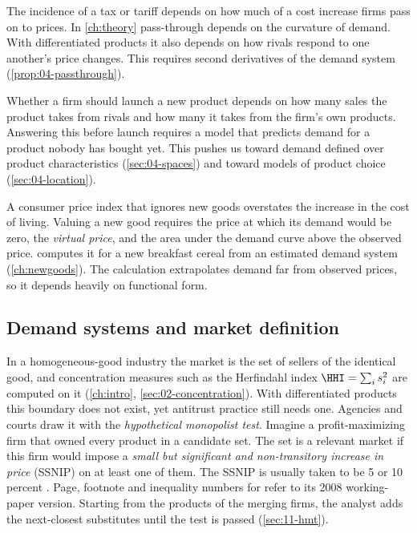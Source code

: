 The incidence of a tax or tariff depends on how much of a cost increase firms pass on to prices. In
\cref{ch:theory} pass-through depends on the curvature of demand. With differentiated products it also depends on
how rivals respond to one another's price changes. This requires second derivatives of the demand system
(\cref{prop:04-passthrough}).

Whether a firm should launch a new product depends on how many sales the product takes from rivals and how many it
takes from the firm's own products. Answering this before launch requires a model that predicts demand for a
product nobody has bought yet. This pushes us toward demand defined over product characteristics
(\cref{sec:04-spaces}) and toward models of product choice (\cref{sec:04-location}).

A consumer price index that ignores new goods overstates the increase in the cost of living. Valuing a new good
requires the price at which its demand would be zero, the \emph{virtual price}, and the area under the demand
curve above the observed price. \citet{Hausman1997} computes it for a new breakfast cereal from an estimated
demand system (\cref{ch:newgoods}). The calculation extrapolates demand far from observed prices, so it depends
heavily on functional form.

\subsection{Demand systems and market definition}\label{sec:04-why-market}

In a homogeneous-good industry the market is the set of sellers of the identical good, and concentration
measures such as the Herfindahl index $\HHI = \sum_i s_i^2$ are computed on it (\cref{ch:intro},
\cref{sec:02-concentration}). With differentiated products this boundary does not exist, yet antitrust practice
still needs one. Agencies and courts draw it with the \emph{hypothetical monopolist test}. Imagine a
profit-maximizing firm that owned every product in a candidate set. The set is a relevant market if this firm would
impose a \emph{small but significant and non-transitory increase in price} (SSNIP) on at least one of them. The SSNIP is
usually taken to be 5 or 10 percent \citep[footnote 58]{FarrellShapiro2010}. Page, footnote and inequality numbers
for \citet{FarrellShapiro2010} refer to its 2008 working-paper version. Starting from the products of the merging
firms, the analyst adds the next-closest substitutes until the test is passed (\cref{sec:11-hmt}).

